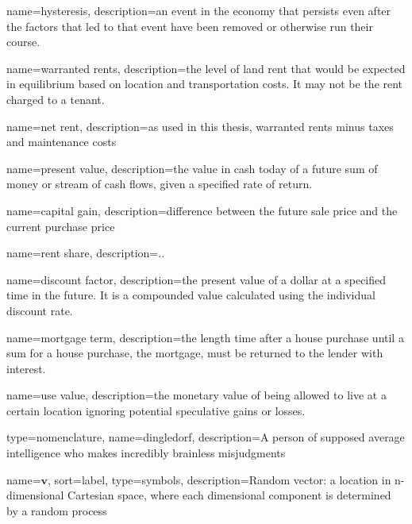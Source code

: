 {
name=hysteresis,
description={an event in the economy that persists even after the factors that led to that event have been removed or otherwise run their course.}
}

{
name=warranted rents,
description={the level of land rent that would be expected in equilibrium based on location and transportation costs. It may not be the rent charged to a tenant.}
}

{
name=net rent,
description={as used in this thesis, warranted rents minus taxes and maintenance costs }
}

{
name=present value,
description={the value in cash today of a future sum of money or stream of cash flows, given a specified rate of return.}
}

{
name=capital gain,
description={difference between the future sale price and the current purchase price}
}

{
name=rent share,
description={..}
}

{
name=discount factor,
description={the present value of a dollar at a specified time in the future. It is a compounded value calculated using the individual discount rate.}
}

{
name=mortgage term,
description={the length time after a house purchase until a sum for a house purchase, the mortgage, must be returned to the lender with interest.}
}

{
name=use value,
description={the monetary value of being allowed to live at a certain location ignoring potential speculative gains or losses. }
}


{
type=nomenclature,
name=dingledorf,
description={A person of supposed average intelligence who makes incredibly brainless misjudgments}
}



{
name={$\mathbf{v}$},
sort={label},
type=symbols,
description={Random vector: a location in n-dimensional Cartesian space, where each dimensional component is determined by a random process}
}